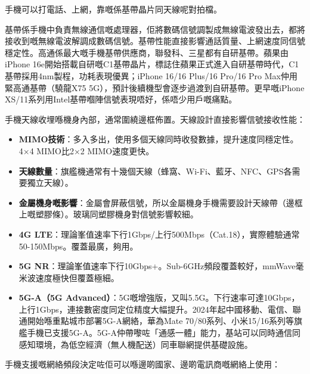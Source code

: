 
手機可以打電話、上網，靠嘅係基帶晶片同天線呢對拍檔。


基帶係手機中負責無線通信嘅處理器，佢將數碼信號調製成無線電波發出去，都將接收到嘅無線電波解調成數碼信號。基帶性能直接影響通話質量、上網速度同信號穩定性。高通係最大嘅手機基帶供應商，聯發科、三星都有自研基帶。蘋果由iPhone 16e開始搭載自研嘅C1基帶晶片，標誌住蘋果正式進入自研基帶時代，C1基帶採用4nm製程，功耗表現優異；iPhone 16/16 Plus/16 Pro/16 Pro Max仲用緊高通基帶（驍龍X75 5G），預計後續機型會逐步過渡到自研基帶。更早嘅iPhone XS/11系列用Intel基帶嗰陣信號表現唔好，係唔少用戶嘅痛點。


手機天線收埋喺機身內部，通常圍繞邊框佈置。天線設計直接影響信號接收性能：

\begin{itemize}
  \item \textbf{MIMO技術}：多入多出，使用多個天線同時收發數據，提升速度同穩定性。4×4 MIMO比2×2 MIMO速度更快。
  \item \textbf{天線數量}：旗艦機通常有十幾個天線（蜂窩、Wi-Fi、藍牙、NFC、GPS各需要獨立天線）。
  \item \textbf{金屬機身嘅影響}：金屬會屏蔽信號，所以金屬機身手機需要設計天線帶（邊框上嘅塑膠條）。玻璃同塑膠機身對信號影響較細。
\end{itemize}


\begin{itemize}
  \item \textbf{4G LTE}：理論峯值速率下行1Gbps/上行500Mbps（Cat.18），實際體驗通常50-150Mbps。覆蓋最廣，夠用。
  \item \textbf{5G NR}：理論峯值速率下行10Gbps+。Sub-6GHz頻段覆蓋較好，mmWave毫米波速度極快但覆蓋極細。
  \item \textbf{5G-A（5G Advanced）}：5G嘅增強版，又叫5.5G。下行速率可達10Gbps，上行1Gbps，連接數密度同定位精度大幅提升。2024年起中國移動、電信、聯通開始喺重點城市部署5G-A網絡，華為Mate 70/80系列、小米15/16系列等旗艦手機已支援5G-A。5G-A仲帶嚟咗「通感一體」能力，基站可以同時通信同感知環境，為低空經濟（無人機配送）同車聯網提供基礎設施。
\end{itemize}


手機支援嘅網絡頻段決定咗佢可以喺邊啲國家、邊啲電訊商嘅網絡上使用：

